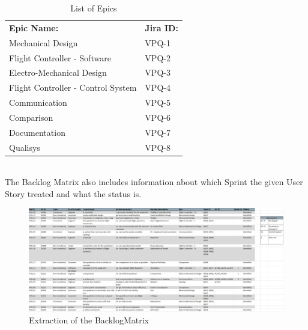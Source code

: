 \begin{table}[h]
\begin{center}
\caption{List of Epics}
\begin{tabular}{l|l}
     \rowcolor{cadetgrey} \textbf{Epic Name:}      & \textbf{Jira ID:} \\
                        Mechanical Design                       & VPQ-1 \\  
\rowcolor{gainsboro}    Flight Controller - Software            & VPQ-2 \\  
                        Electro-Mechanical Design               & VPQ-3 \\  
\rowcolor{gainsboro}    Flight Controller - Control System      & VPQ-4 \\  
                        Communication                           & VPQ-5 \\  
\rowcolor{gainsboro}    Comparison                              & VPQ-6 \\  
                        Documentation                           & VPQ-7 \\  
\rowcolor{gainsboro}    Qualisys                                & VPQ-8 \\ 
                           
\end{tabular}
\end{center}
\end{table}
\\ 
The Backlog Matrix also includes information about which Sprint the given User Story treated and what the status is. 

\begin{figure}[h]
    \centering
        \includegraphics[width = 1\textwidth]{VAPIQ-PICTURES/BacklogMatrix}
    \caption{Extraction of the BacklogMatrix}
    \label{fig:backlog}
\end{figure}

\newpage

